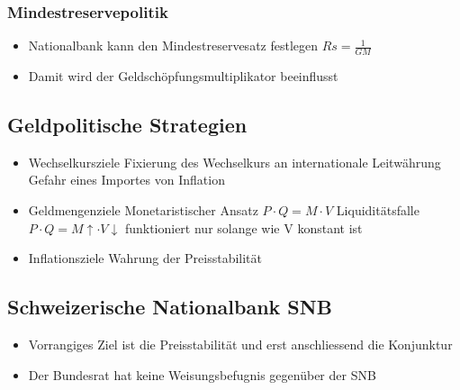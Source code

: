 \subsubsection{Mindestreservepolitik}
\begin{itemize}
	\item Nationalbank kann den Mindestreservesatz festlegen $Rs = \frac{1}{GM}$
	\item Damit wird der Geldschöpfungsmultiplikator beeinflusst
\end{itemize}
\subsection{Geldpolitische Strategien}
\begin{itemize}
	\item Wechselkursziele
	\subitem Fixierung des Wechselkurs an internationale Leitwährung
	\subitem Gefahr eines Importes von Inflation
	\item Geldmengenziele
	\subitem Monetaristischer Ansatz $P \cdot Q = M \cdot V$
    \subitem \quad Liquiditätsfalle $P \cdot Q = M\uparrow \cdot V \downarrow$
	\subitem funktioniert nur solange wie V konstant ist
	\item Inflationsziele
	\subitem Wahrung der Preisstabilität
\end{itemize}
\subsection{Schweizerische Nationalbank SNB}
\begin{itemize}
	\item Vorrangiges Ziel ist die Preisstabilität und erst anschliessend die Konjunktur
	\item Der Bundesrat hat keine Weisungsbefugnis gegenüber der SNB
\end{itemize}
\vspace{1cm}